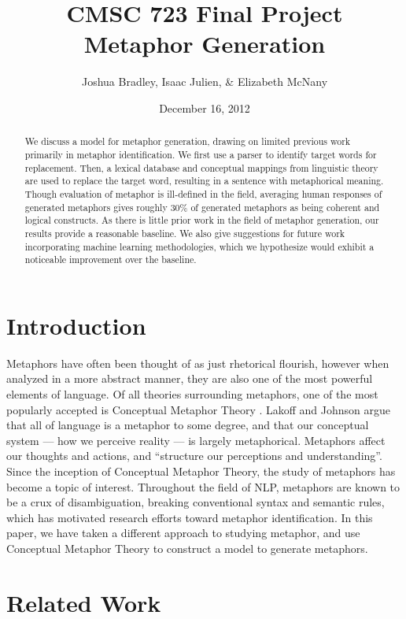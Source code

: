 \documentclass[12pt]{article}
\title{CMSC 723 Final Project\\
Metaphor Generation}
\author{Joshua Bradley, Isaac Julien, \& Elizabeth McNany}
\date{December 16, 2012}
\begin{document}
\maketitle

\begin{abstract}
We discuss a model for metaphor generation, drawing on limited previous work primarily in metaphor identification.  We first use a parser to identify target words for replacement.  Then, a lexical database and conceptual mappings from linguistic theory are used to replace the target word, resulting in a sentence with metaphorical meaning.  Though evaluation of metaphor is ill-defined in the field, averaging human responses of generated metaphors gives roughly 30\% of generated metaphors as being coherent and logical constructs.  As there is little prior work in the field of metaphor generation, our results provide a reasonable baseline. We also give suggestions for future work incorporating machine learning methodologies, which we hypothesize would exhibit a noticeable improvement over the baseline.
\end{abstract}

\newpage
\tableofcontents
\newpage

\section{Introduction}

Metaphors have often been thought of as just rhetorical flourish, however when analyzed in a more abstract manner, they are also one of the most powerful elements of language. Of all theories surrounding metaphors, one of the most popularly accepted is Conceptual Metaphor Theory \cite{lakoff80}. Lakoff and Johnson argue that all of language is a metaphor to some degree, and that our conceptual system --- how we perceive reality --- is largely metaphorical. Metaphors affect our thoughts and actions, and ``structure our perceptions and understanding''. Since the inception of Conceptual Metaphor Theory, the study of metaphors has become a topic of interest. Throughout the field of NLP, metaphors are known to be a crux of disambiguation, breaking conventional syntax and semantic rules, which has motivated research efforts toward metaphor identification.  In this paper, we have taken a different approach to studying metaphor, and use Conceptual Metaphor Theory to construct a model to generate metaphors.

\section{Related Work}
\end{document}
